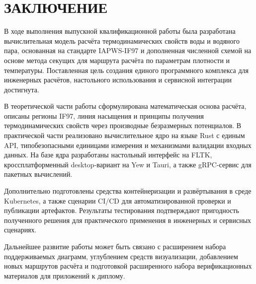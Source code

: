 \clearpage
\chapter*{ЗАКЛЮЧЕНИЕ}

В ходе выполнения выпускной квалификационной работы была разработана
вычислительная модель расчёта термодинамических свойств воды и водяного пара,
основанная на стандарте IAPWS-IF97 и дополненная численной схемой на основе
метода секущих для маршрута расчёта по параметрам плотности и температуры.
Поставленная цель создания единого программного комплекса для инженерных
расчётов, настольного использования и сервисной интеграции достигнута.

В теоретической части работы сформулирована математическая основа расчёта,
описаны регионы IF97, линия насыщения и принципы получения термодинамических
свойств через производные безразмерных потенциалов.
В практической части реализовано вычислительное ядро на языке Rust с единым API,
типобезопасными единицами измерения и механизмами валидации входных данных.
На базе ядра разработаны настольный интерфейс на FLTK, кроссплатформенный
desktop-вариант на Yew и Tauri, а также gRPC-сервис для пакетных вычислений.

Дополнительно подготовлены средства контейнеризации и развёртывания в среде
Kubernetes, а также сценарии CI/CD для автоматизированной проверки и публикации
артефактов.
Результаты тестирования подтверждают пригодность полученного решения для
практического применения в инженерных и сервисных сценариях.

Дальнейшее развитие работы может быть связано с расширением набора поддерживаемых
диаграмм, углублением средств визуализации, добавлением новых маршрутов расчёта
и подготовкой расширенного набора верификационных материалов для приложений к
диплому.
